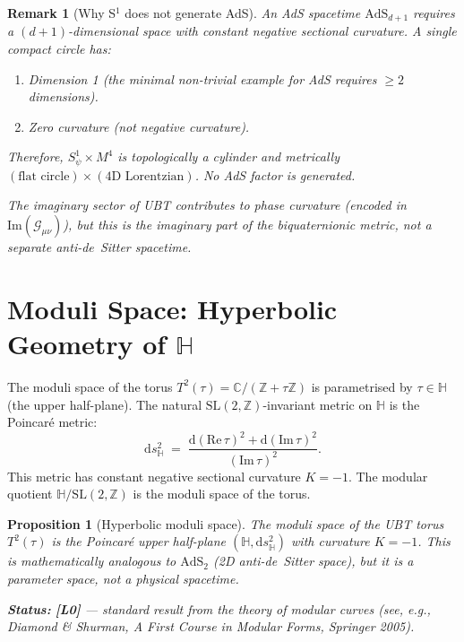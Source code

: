 \documentclass[11pt,a4paper]{article}
\newtheorem{proposition}{Proposition}
\newtheorem{remark}{Remark}
\begin{document}
\begin{remark}[Why S$^1$ does not generate AdS]
An AdS spacetime $\mathrm{AdS}_{d+1}$ requires a $(d+1)$-dimensional space with
constant negative sectional curvature. A single compact circle has:
\begin{enumerate}
  \item Dimension 1 (the minimal non-trivial example for AdS requires $\geq 2$ dimensions).
  \item Zero curvature (not negative curvature).
\end{enumerate}
Therefore, $S^1_\psi \times M^4$ is topologically a cylinder and metrically
$(\text{flat circle}) \times (\text{4D Lorentzian})$. No AdS factor is generated.

The imaginary sector of UBT contributes to phase curvature (encoded in
$\mathrm{Im}(\mathcal{G}_{\mu\nu})$), but this is the \emph{imaginary part} of
the biquaternionic metric, not a separate anti-de~Sitter spacetime.
\end{remark}

\section{Moduli Space: Hyperbolic Geometry of $\mathbb{H}$}
\label{sec:moduli_hyperbolic}

The moduli space of the torus $T^2(\tau) = \mathbb{C}/(\mathbb{Z}+\tau\mathbb{Z})$
is parametrised by $\tau \in \mathbb{H}$ (the upper half-plane). The natural
$\mathrm{SL}(2,\mathbb{Z})$-invariant metric on $\mathbb{H}$ is the Poincaré metric:
\begin{equation}
  \mathrm{d}s^2_{\mathbb{H}} \;=\; \frac{\mathrm{d}(\mathrm{Re}\,\tau)^2 + \mathrm{d}(\mathrm{Im}\,\tau)^2}{(\mathrm{Im}\,\tau)^2}.
\end{equation}
This metric has constant negative sectional curvature $K = -1$. The modular
quotient $\mathbb{H}/\mathrm{SL}(2,\mathbb{Z})$ is the moduli space of the torus.

\begin{proposition}[Hyperbolic moduli space]\label{prop:hyp_moduli}
The moduli space of the UBT torus $T^2(\tau)$ is the Poincaré upper half-plane
$(\mathbb{H}, \mathrm{d}s^2_{\mathbb{H}})$ with curvature $K = -1$.
This is mathematically analogous to $\mathrm{AdS}_2$ (2D anti-de~Sitter space),
but it is a \emph{parameter space}, not a physical spacetime.

\noindent\textbf{Status:} \textbf{[L0]} — standard result from the theory of
modular curves (see, e.g., Diamond \& Shurman, \emph{A First Course in Modular Forms},
Springer 2005).
\end{proposition}
\end{document}
